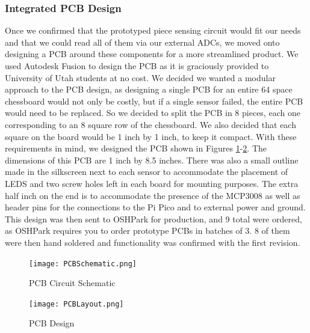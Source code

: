 \documentclass[11pt,journal]{IEEEtran}
\begin{document}
\subsubsection{Integrated PCB Design}
Once we confirmed that the prototyped piece sensing circuit would fit our needs and that we could read all of them via our external ADCs, we moved onto designing a PCB around these components for a more streamlined product. We used Autodesk Fusion to design the PCB as it is graciously provided to University of Utah students at no cost. We decided we wanted a modular approach to the PCB design, as designing a single PCB for an entire 64 space chessboard would not only be costly, but if a single sensor failed, the entire PCB would need to be replaced. So we decided to split the PCB in 8 pieces, each one corresponding to an 8 square row of the chessboard. We also decided that each square on the board would be 1 inch by 1 inch, to keep it compact. With these requirements in mind, we designed the PCB shown in Figures \ref{pcbschematic}-\ref{pcbdesign}. The dimensions of this PCB are 1 inch by 8.5 inches. There was also a small outline made in the silkscreen next to each sensor to accommodate the placement of LEDS and two screw holes left in each board for mounting purposes. The extra half inch on the end is to accommodate the presence of the MCP3008 as well as header pins for the connections to the Pi Pico and to external power and ground. This design was then sent to OSHPark for production, and 9 total were ordered, as OSHPark requires you to order prototype PCBs in batches of 3. 8 of them were then hand soldered and functionality was confirmed with the first revision.
\begin{figure}[ht]
  \texttt{[image: PCBSchematic.png]}
  \caption{PCB Circuit Schematic}
  \label{pcbschematic}
\end{figure}
\begin{figure}[ht]
  \texttt{[image: PCBLayout.png]}
  \caption{PCB Design}
  \label{pcbdesign}
\end{figure}
\end{document}
